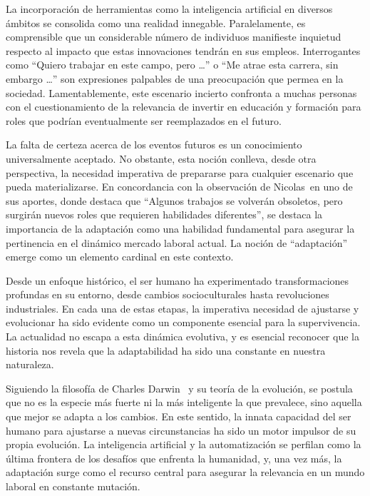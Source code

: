 \documentclass[letterpaper, 12pt]{article}
\newcommand{\memberNicolas}{Nicolas~}
\begin{document}
La incorporación de herramientas como la inteligencia
artificial en diversos ámbitos se consolida como una
realidad innegable. Paralelamente, es comprensible que un
considerable número de individuos manifieste inquietud
respecto al impacto que estas innovaciones tendrán en sus
empleos. Interrogantes como ``Quiero trabajar en este
campo, pero \dots'' o ``Me atrae esta carrera, sin embargo
\dots'' son expresiones palpables de una preocupación que
permea en la sociedad. Lamentablemente, este escenario
incierto confronta a muchas personas con el cuestionamiento
de la relevancia de invertir en educación y formación para
roles que podrían eventualmente ser reemplazados en el
futuro.

La falta de certeza acerca de los eventos futuros es un
conocimiento universalmente aceptado. No obstante, esta
noción conlleva, desde otra perspectiva, la necesidad
imperativa de prepararse para cualquier escenario que pueda
materializarse. En concordancia con la observación de
\memberNicolas en uno de sus aportes, donde destaca que
``Algunos trabajos se volverán obsoletos, pero surgirán
nuevos roles que requieren habilidades diferentes'', se
destaca la importancia de la adaptación como una habilidad
fundamental para asegurar la pertinencia en el dinámico
mercado laboral actual. La noción de ``adaptación'' emerge
como un elemento cardinal en este contexto.

Desde un enfoque histórico, el ser humano ha experimentado
transformaciones profundas en su entorno, desde cambios
socioculturales hasta revoluciones industriales. En cada
una de estas etapas, la imperativa necesidad de ajustarse y
evolucionar ha sido evidente como un componente esencial
para la supervivencia. La actualidad no escapa a esta
dinámica evolutiva, y es esencial reconocer que la historia
nos revela que la adaptabilidad ha sido una constante en
nuestra naturaleza.

Siguiendo la filosofía de Charles Darwin~\cite{Darwin} y su
teoría de la evolución, se postula que no es la especie más
fuerte ni la más inteligente la que prevalece, sino aquella
que mejor se adapta a los cambios. En este sentido, la
innata capacidad del ser humano para ajustarse a nuevas
circunstancias ha sido un motor impulsor de su propia
evolución. La inteligencia artificial y la automatización
se perfilan como la última frontera de los desafíos que
enfrenta la humanidad, y, una vez más, la adaptación surge
como el recurso central para asegurar la relevancia en un
mundo laboral en constante mutación.
\end{document}
